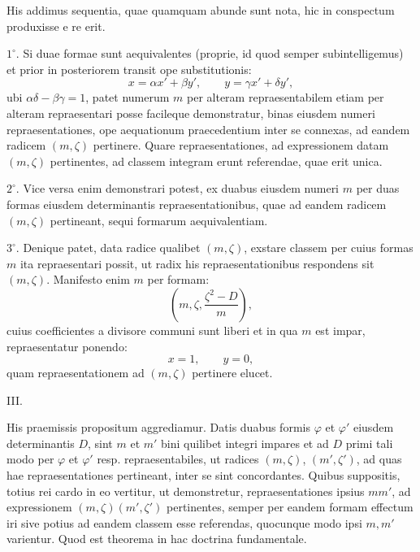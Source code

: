 \documentclass[11pt]{article}
\begin{document}
His addimus sequentia, quae quamquam abunde sunt nota, hic in conspectum produxisse e re erit.

$1^\circ$. Si duae formae sunt aequivalentes (proprie, id quod semper subintelligemus) et prior in posteriorem transit ope substitutionis:
\[
 x=\alpha x'+\beta y',\qquad y=\gamma x'+\delta y',
\]
ubi $\alpha\delta-\beta\gamma=1$, patet numerum $m$ per alteram repraesentabilem etiam per alteram repraesentari posse facileque demonstratur, binas eiusdem numeri repraesentationes, ope aequationum praecedentium inter se connexas, ad eandem radicem $(m,\zeta)$ pertinere. Quare repraesentationes, ad expressionem datam $(m,\zeta)$ pertinentes, ad classem integram erunt referendae, quae erit unica.

$2^\circ$. Vice versa enim demonstrari potest, ex duabus eiusdem numeri $m$ per duas formas eiusdem determinantis repraesentationibus, quae ad eandem radicem $(m,\zeta)$ pertineant, sequi formarum aequivalentiam.

$3^\circ$. Denique patet, data radice qualibet $(m,\zeta)$, exstare classem per cuius formas $m$ ita repraesentari possit, ut radix his repraesentationibus respondens sit $(m,\zeta)$. Manifesto enim $m$ per formam:
\[
 \left(m,\zeta,\frac{\zeta^2-D}{m}\right),
\]
cuius coefficientes a divisore communi sunt liberi et in qua $m$ est impar, repraesentatur ponendo:
\[
 x=1,\qquad y=0,
\]
quam repraesentationem ad $(m,\zeta)$ pertinere elucet.

\begin{center}III.\end{center}

His praemissis propositum aggrediamur. Datis duabus formis $\varphi$ et $\varphi'$ eiusdem determinantis $D$, sint $m$ et $m'$ bini quilibet integri impares et ad $D$ primi tali modo per $\varphi$ et $\varphi'$ resp. repraesentabiles, ut radices $(m,\zeta)$, $(m',\zeta')$, ad quas hae repraesentationes pertineant, inter se sint concordantes. Quibus suppositis, totius rei cardo in eo vertitur, ut demonstretur, repraesentationes ipsius $mm'$, ad expressionem $(m,\zeta)(m',\zeta')$ pertinentes, semper per eandem formam effectum iri sive potius ad eandem classem esse referendas, quocunque modo ipsi $m,m'$ varientur. Quod est theorema in hac doctrina fundamentale.
\end{document}
